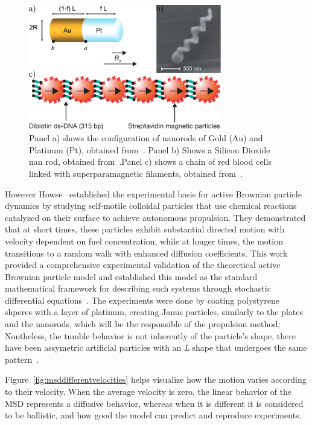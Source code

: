 \begin{figure}
  \begin{center}
    \includegraphics[width=0.75\textwidth]{figures/artificialExamples.pdf}
  \end{center}
  \caption[Artificail microswimmers]{Panel a) shows the configuration of nanorods of Gold (Au) and Platinum (Pt), obtained from~\cite{paxton2004catalytic}. Panel b) Shows a Silicon Dioxide nan rod, obtained from~\cite{ghosh2009controlled}.Panel c) shows a chain of red blood cells linked with superparamagnetic filaments, obtained from~\cite{dreyfus2005microscopic}.}\label{fig:artificialexamples}
\end{figure}


However Howse~\cite{howse2007self} established the experimental basis for active Brownian particle dynamics by studying self-motile colloidal particles that use chemical reactions catalyzed on their surface to achieve autonomous propulsion. They demonstrated that at short times, these particles exhibit substantial directed motion with velocity dependent on fuel concentration, while at longer times, the motion transitions to a random walk with enhanced diffusion coefficients. This work provided a comprehensive experimental validation of the theoretical active Brownian particle model and established this model as the standard mathematical framework for describing such systems through stochastic differential equations~\cite{palacci2010sedimentation}. The experiments were done by coating polystyrene shperes with a layer of platinum, creating Janus particles, similarly to the plates and the nanorods, which will be the responsible of the propulsion method; Nontheless, the tumble behavior is not inherently of the particle's shape, there have been assymetric artificial particles with an \textit{L} shape that undergoes the same pattern~\cite{kummel2013circular}.

Figure~\ref{fig:msddifferentvelocities} helps visualize how  the motion varies according to their velocity. When the average velocity is zero, the linear behavior of the MSD represents a diffusive behavior, whereas when it is different it is considered to be ballistic, and how good the model can predict and reproduce experiments. 

